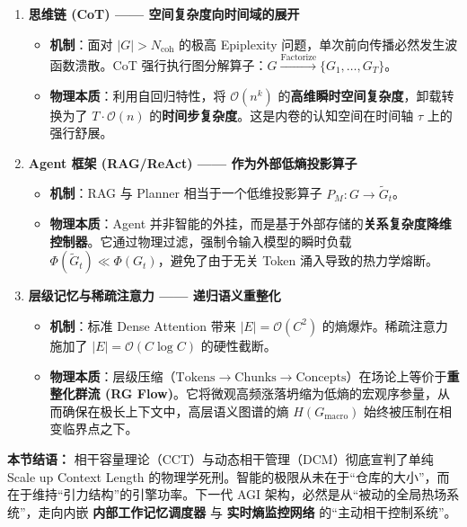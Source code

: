 \begin{enumerate}
    \item \textbf{\textcolor{structurecolor}{思维链 (CoT) —— 空间复杂度向时间域的展开}}
    \begin{itemize}
        \item \textbf{机制}：面对 $|G| > N_{\text{coh}}$ 的极高 Epiplexity 问题，单次前向传播必然发生波函数溃散。CoT 强行执行图分解算子：$G \xrightarrow{\text{Factorize}} \{G_1, \dots, G_T\}$。
        \item \textbf{物理本质}：利用自回归特性，将 $\mathcal{O}(n^k)$ 的\textbf{高维瞬时空间复杂度}，卸载转换为了 $T \cdot \mathcal{O}(n)$ 的\textbf{时间步复杂度}。这是内卷的认知空间在时间轴 $\tau$ 上的强行舒展。
    \end{itemize}

    \item \textbf{\textcolor{structurecolor}{Agent 框架 (RAG/ReAct) —— 作为外部低熵投影算子}}
    \begin{itemize}
        \item \textbf{机制}：RAG 与 Planner 相当于一个低维投影算子 $P_M: G \to \tilde{G}_t$。
        \item \textbf{物理本质}：Agent 并非智能的外挂，而是基于外部存储的\textbf{关系复杂度降维控制器}。它通过物理过滤，强制令输入模型的瞬时负载 $\Phi(\tilde{G}_t) \ll \Phi(G_t)$，避免了由于无关 Token 涌入导致的热力学熔断。
    \end{itemize}

    \item \textbf{\textcolor{structurecolor}{层级记忆与稀疏注意力 —— 递归语义重整化}}
    \begin{itemize}
        \item \textbf{机制}：标准 Dense Attention 带来 $|E| = \mathcal{O}(C^2)$ 的熵爆炸。稀疏注意力施加了 $|E| = \mathcal{O}(C \log C)$ 的硬性截断。
        \item \textbf{物理本质}：层级压缩（$\text{Tokens} \to \text{Chunks} \to \text{Concepts}$）在场论上等价于\textbf{重整化群流 (RG Flow)}。它将微观高频涨落坍缩为低熵的宏观序参量，从而确保在极长上下文中，高层语义图谱的熵 $H(G_{\text{macro}})$ 始终被压制在相变临界点之下。
    \end{itemize}
\end{enumerate}

\textbf{本节结语：}
相干容量理论（CCT）与动态相干管理（DCM）彻底宣判了单纯 Scale up Context Length 的物理学死刑。智能的极限从未在于“仓库的大小”，而在于维持“引力结构”的引擎功率。下一代 AGI 架构，必然是从“被动的全局热场系统”，走向内嵌 \textbf{内部工作记忆调度器} 与 \textbf{实时熵监控网络} 的“主动相干控制系统”。


